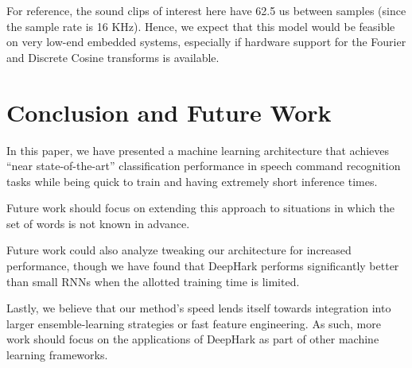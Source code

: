 \documentclass[12pt]{article}
\begin{document}
For reference, the sound clips of interest here have 62.5 us between samples (since the sample rate is 16 KHz). Hence, we expect that this model would be feasible on very low-end embedded systems, especially if hardware support for the Fourier and Discrete Cosine transforms is available.

\section{Conclusion and Future Work}

In this paper, we have presented a machine learning architecture that achieves ``near state-of-the-art'' classification performance in speech command recognition tasks while being quick to train and having extremely short inference times.

Future work should focus on extending this approach to situations in which the set of words is not known in advance.

Future work could also analyze tweaking our architecture for increased performance, though we have found that DeepHark performs significantly better than small RNNs when the allotted training time is limited.

Lastly, we believe that our method's speed lends itself towards integration into larger ensemble-learning strategies or fast feature engineering. As such, more work should focus on the applications of DeepHark as part of other machine learning frameworks.

\clearpage

\end{document}
